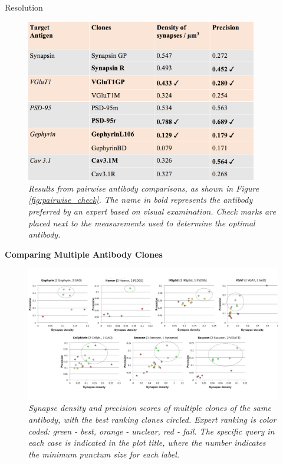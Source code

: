 \documentclass[final, table]{beamer}
\newlength{\onecolwid}
\begin{document}
\begin{frame}[t]
\begin{columns}[t]
\begin{column}{\onecolwid}
\begin{block}{Resolution}
\begin{figure}
\centering
\includegraphics[width=0.9\textwidth]{figs/pairwise_table}
\caption{\textit{Results from pairwise antibody comparisons, as shown in Figure \ref{fig:pairwise_check}.  The name in bold represents the antibody preferred by an expert based on visual examination.  Check marks are placed next to the measurements used to determine the optimal antibody.}}
\label{fig:pairwise_table}
\end{figure}

\textbf{Comparing Multiple Antibody Clones} 


\begin{figure}
\centering
\includegraphics[width=1\textwidth]{figs/multiple_clones_graphs}
\caption{\textit{Synapse density and precision scores of multiple clones of the same antibody, with the best ranking clones circled. Expert ranking is color coded: green - best, orange - unclear, red - fail. The specific query in each case is indicated in the plot title, where the number indicates the minimum punctum size for each label.  }}
\label{fig:multiple_clones_graphs}
\end{figure}
\end{block} 


\end{column}
\end{columns}
\end{frame}
\end{document}
